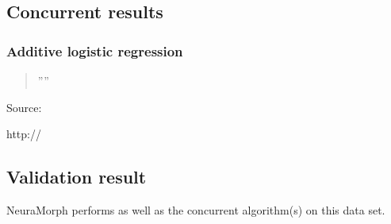 \documentclass[8pt, a4paper]{article}
\begin{document}
%

\subsection{Concurrent results}

\subsubsection{Additive logistic regression}

\begin{quote}
''''
\end{quote}

Source:

http://

\subsection{Validation result}

NeuraMorph performs as well as the concurrent algorithm(s) on this data set.
\end{document}

